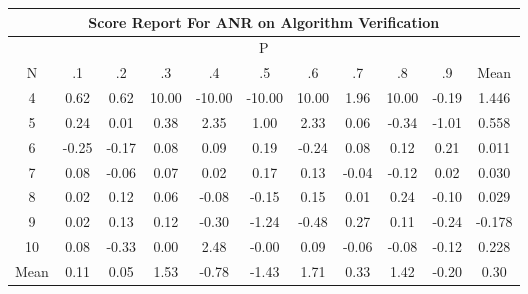 \documentclass[11pt,a4paper]{report}
\begin{document}
\begin{longtable}{ | c || c | c | c | c | c | c | c | c | c || c |}
\hline
\multicolumn{11}{|c|}{ Score Report For ANR on Algorithm Verification} \\
\hline
\multicolumn{11}{|c|}{ P } \\
\hline
N & .1 & .2 & .3 & .4 & .5 & .6 & .7 & .8 & .9 & Mean\\
 \hline
 \hline
 \endhead
  4 &  \cellcolor[HTML]{EFEFFF} 0.62 &  \cellcolor[HTML]{EFEFFF} 0.62 &  \cellcolor[HTML]{0808FF} 10.00 &  \cellcolor[HTML]{FF0000} -10.00 &  \cellcolor[HTML]{FF0000} -10.00 &  \cellcolor[HTML]{0808FF} 10.00 &  \cellcolor[HTML]{CFCFFF} 1.96 &  \cellcolor[HTML]{0808FF} 10.00 &  \cellcolor[HTML]{FFF7F7} -0.19 & 1.446 \\
  5 &  \cellcolor[HTML]{F7F7FF} 0.24 &  \cellcolor[HTML]{FFFFFF} 0.01 &  \cellcolor[HTML]{F7F7FF} 0.38 &  \cellcolor[HTML]{C7C7FF} 2.35 &  \cellcolor[HTML]{E7E7FF} 1.00 &  \cellcolor[HTML]{C7C7FF} 2.33 &  \cellcolor[HTML]{FFFFFF} 0.06 &  \cellcolor[HTML]{FFF7F7} -0.34 &  \cellcolor[HTML]{FFE7E7} -1.01 & 0.558 \\
  6 &  \cellcolor[HTML]{FFF7F7} -0.25 &  \cellcolor[HTML]{FFF7F7} -0.17 &  \cellcolor[HTML]{FFFFFF} 0.08 &  \cellcolor[HTML]{FFFFFF} 0.09 &  \cellcolor[HTML]{F7F7FF} 0.19 &  \cellcolor[HTML]{FFF7F7} -0.24 &  \cellcolor[HTML]{FFFFFF} 0.08 &  \cellcolor[HTML]{FFFFFF} 0.12 &  \cellcolor[HTML]{F7F7FF} 0.21 & 0.011 \\
  7 &  \cellcolor[HTML]{FFFFFF} 0.08 &  \cellcolor[HTML]{FFFFFF} -0.06 &  \cellcolor[HTML]{FFFFFF} 0.07 &  \cellcolor[HTML]{FFFFFF} 0.02 &  \cellcolor[HTML]{F7F7FF} 0.17 &  \cellcolor[HTML]{FFFFFF} 0.13 &  \cellcolor[HTML]{FFFFFF} -0.04 &  \cellcolor[HTML]{FFFFFF} -0.12 &  \cellcolor[HTML]{FFFFFF} 0.02 & 0.030 \\
  8 &  \cellcolor[HTML]{FFFFFF} 0.02 &  \cellcolor[HTML]{FFFFFF} 0.12 &  \cellcolor[HTML]{FFFFFF} 0.06 &  \cellcolor[HTML]{FFFFFF} -0.08 &  \cellcolor[HTML]{FFFFFF} -0.15 &  \cellcolor[HTML]{FFFFFF} 0.15 &  \cellcolor[HTML]{FFFFFF} 0.01 &  \cellcolor[HTML]{F7F7FF} 0.24 &  \cellcolor[HTML]{FFFFFF} -0.10 & 0.029 \\
  9 &  \cellcolor[HTML]{FFFFFF} 0.02 &  \cellcolor[HTML]{FFFFFF} 0.13 &  \cellcolor[HTML]{FFFFFF} 0.12 &  \cellcolor[HTML]{FFF7F7} -0.30 &  \cellcolor[HTML]{FFDFDF} -1.24 &  \cellcolor[HTML]{FFEFEF} -0.48 &  \cellcolor[HTML]{F7F7FF} 0.27 &  \cellcolor[HTML]{FFFFFF} 0.11 &  \cellcolor[HTML]{FFF7F7} -0.24 & -0.178 \\
  10 &  \cellcolor[HTML]{FFFFFF} 0.08 &  \cellcolor[HTML]{FFF7F7} -0.33 &  \cellcolor[HTML]{FFFFFF} 0.00 &  \cellcolor[HTML]{BFBFFF} 2.48 &  \cellcolor[HTML]{FFFFFF} -0.00 &  \cellcolor[HTML]{FFFFFF} 0.09 &  \cellcolor[HTML]{FFFFFF} -0.06 &  \cellcolor[HTML]{FFFFFF} -0.08 &  \cellcolor[HTML]{FFFFFF} -0.12 & 0.228 \\
 \hline
 \hline
Mean &  \cellcolor[HTML]{FFFFFF} 0.11 &  \cellcolor[HTML]{FFFFFF} 0.05 &  \cellcolor[HTML]{D7D7FF} 1.53 &  \cellcolor[HTML]{FFEFEF} -0.78 &  \cellcolor[HTML]{FFD7D7} -1.43 &  \cellcolor[HTML]{D7D7FF} 1.71 &  \cellcolor[HTML]{F7F7FF} 0.33 &  \cellcolor[HTML]{DFDFFF} 1.42 &  \cellcolor[HTML]{FFF7F7} -0.20 &  \cellcolor[HTML]{F7F7FF} 0.30
\end{longtable}
\end{document}
